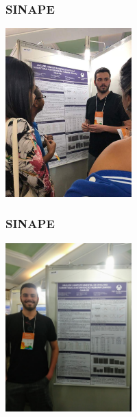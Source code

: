 \documentclass[10pt,
  aspectratio=169,
  serif,
  mathserif,
  professionalfont,
  compress,
  handout,
  ]{beamer}\usepackage[]{graphicx}\usepackage[]{color}
\begin{document}
\begin{frame}

\frametitle{SINAPE}

\begin{center}
  \includegraphics[height=6.5cm]{img/sinape4.jpg}
\end{center}

\end{frame}


\begin{frame}

\frametitle{SINAPE}

\begin{center}
  \includegraphics[height=6.5cm]{img/sinape2.jpg}
\end{center}

\end{frame}

\end{document}
